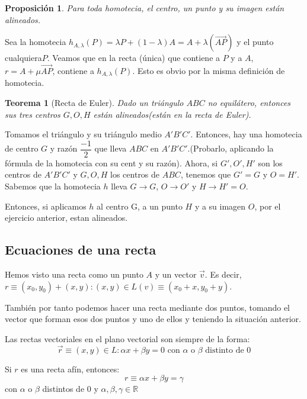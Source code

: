 \documentclass[11pt, a4paper, titlepage]{article}
\makeatletter
\renewenvironment{proof}[1][\proofname] {\vspace{-15pt}\par\pushQED{\qed}\normalfont\topsep6\p@\@plus6\p@\relax\trivlist\item[\hskip\labelsep\it#1\@addpunct{.}]\ignorespaces}{\popQED\endtrivlist\@endpefalse}
\newcommand{\R}{\mathbb{R}}
\renewcommand{\vec}{\overrightarrow}
\renewenvironment{proof}[1][\proofname] {\par\pushQED{\qed}\normalfont\topsep6\p@\@plus6\p@\relax\trivlist\item[\hskip\labelsep\itshape\sffamily#1\@addpunct{.}]\ignorespaces}{\popQED\endtrivlist\@endpefalse}
\theoremstyle{theorem-style}
\newtheorem{nth}{Teorema}[section]
\newtheorem{nprop}{Proposición}[section]
\theoremstyle{definition-style}
\theoremstyle{remark-style}
\theoremstyle{example-style}
\makeatother
\begin{document}
\begin{nprop}
	
Para toda homotecia, el centro, un punto y su imagen están alineados.
\end{nprop}

\begin{proof}
	Sea la homotecia $h_{A,\lambda}(P) = \lambda P + (1-\lambda)A = A+\lambda(\vec{AP})$ y el punto cualquiera$P$. Veamos que en la recta (única) que contiene a $P$ y a $ A$, $r= A + \mu \vec{AP}$,  contiene a $h_{A,\lambda} (P)$. Esto es obvio por la misma definición de homotecia.
	
	
\end{proof}


\begin{nth}[Recta de Euler]
  Dado un triángulo $ABC$ no equilátero, entonces sus tres centros $G,O,H$ están alineados(están en la recta de Euler).
\end{nth}
\begin{proof}
  Tomamos el triángulo y su triángulo medio $A'B'C'$. Entonces, hay una homotecia de centro $G$ y razón $\dfrac{-1}{2}$ que lleva $ABC$ en $A'B'C'$.(Probarlo, aplicando la fórmula de la homotecia con su cent y su razón). 
  Ahora, si $G',O',H'$ son los centros de $A'B'C'$ y $G,O,H$ los centros de $ABC$, tenemos que $G'=G$ y $O=H'$. Sabemos que la homotecia $h$ lleva $G \to G$, $O \to O'$ y $H \to H' = O$.
  
  Entonces, si aplicamos $h$ al centro G, a un punto $H$ y a su imagen $O$, por el ejercicio anterior, estan alineados.
  
\end{proof}



\subsection{Ecuaciones de una recta}
Hemos visto una recta como un punto $A$ y un vector $\vec{v}$. Es decir, $r \equiv (x_0,y_0) +(x,y) : (x,y) \in L(v) \equiv (x_0+x,y_0+y) $.

También por tanto podemos hacer una recta mediante dos puntos, tomando el vector que forman esos dos puntos y uno de ellos y teniendo la situación anterior.

Las rectas vectoriales en el plano vectorial son siempre de la forma:
\[
  \vec{r} \equiv (x,y) \in L : \alpha x + \beta y = 0 \text{  con $\alpha$ o $\beta$ distinto de 0}
\]

Si $r$ es una recta afín, entonces:
\[
  r \equiv \alpha x + \beta y = \gamma
\] con $\alpha$ o $\beta$ distintos de $0$ y $\alpha,\beta,\gamma \in \R$
\end{document}
